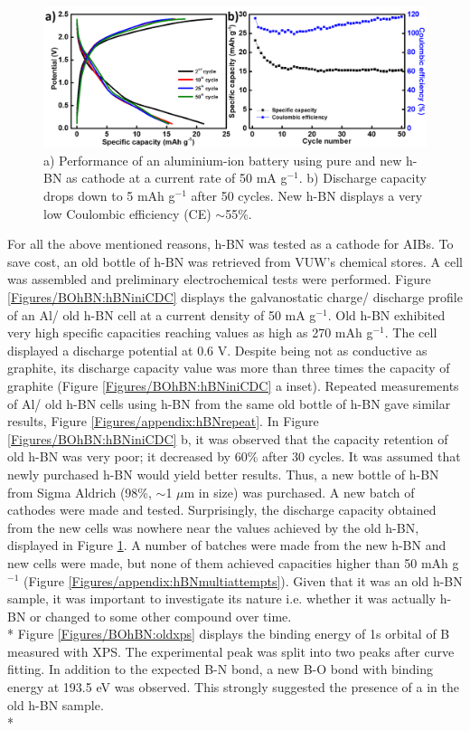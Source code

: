 \begin{figure}[tbh!]
\centering
\includegraphics[width=\textwidth]{Figures/BOhBN/newhbncdcce}
\caption{a) Performance of an aluminium-ion battery using pure and new h-BN as cathode at a current rate of 50 mA g$^{-1}$. b) Discharge capacity drops down to 5 mAh g$^{-1}$ after 50 cycles. New h-BN displays a very low Coulombic efficiency (CE) $\sim$55\%.}
\label{Figures/BOhBN:newhbncdcce}
\end{figure}

For all the above mentioned reasons, h-BN was tested as a cathode for AIBs. To save cost, an old bottle of h-BN was retrieved from VUW's chemical stores. A cell was assembled and preliminary electrochemical tests were performed. Figure \ref{Figures/BOhBN:hBNiniCDC} displays the galvanostatic charge/ discharge profile of an Al/ old h-BN cell at a current density of 50 mA g$^{-1}$. Old h-BN exhibited very high specific capacities reaching values as high as 270 mAh g$^{-1}$. The cell displayed a discharge potential at 0.6 V. Despite being not as conductive as graphite, its discharge capacity value was more than three times the capacity of graphite (Figure \ref{Figures/BOhBN:hBNiniCDC} a inset). Repeated measurements of Al/ old h-BN cells using h-BN from the same old bottle of h-BN gave similar results, Figure \ref{Figures/appendix:hBNrepeat}. In Figure \ref{Figures/BOhBN:hBNiniCDC} b, it was observed that the capacity retention of old h-BN was very poor; it decreased by 60\% after 30 cycles. It was assumed that newly purchased h-BN would yield better results. Thus, a new bottle of h-BN from Sigma Aldrich (98\%, $\sim$1 $\mu$m in size) was purchased. A new batch of cathodes were made and tested. Surprisingly, the discharge capacity obtained from the new cells was nowhere near the values achieved by the old h-BN, displayed in Figure \ref{Figures/BOhBN:newhbncdcce}. A number of batches were made from the new h-BN and new cells were made, but none of them achieved capacities higher than 50 mAh g$^{-1}$ (Figure \ref{Figures/appendix:hBNmultiattempts}). Given that it was an old h-BN sample, it was important to investigate its nature i.e. whether it was actually h-BN or changed to some other compound over time.\\*
Figure \ref{Figures/BOhBN:oldxps} displays the binding energy of 1s orbital of B measured with XPS. The experimental peak was split into two peaks after curve fitting. In addition to the expected B-N bond, a new B-O bond with binding energy at 193.5 eV was observed. This strongly suggested the presence of a  in the old h-BN sample. \\*

